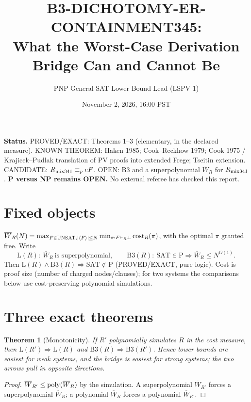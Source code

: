 \documentclass[11pt]{article}
\title{B3-DICHOTOMY-ER-CONTAINMENT345:\\ What the Worst-Case Derivation Bridge Can and Cannot Be}
\author{PNP General SAT Lower-Bound Lead (LSPV-1)}
\date{November 2, 2026, 16:00 PST}
\newtheorem{theorem}{Theorem}
\begin{document}
\maketitle
\noindent\textbf{Status.} PROVED/EXACT: Theorems 1--3 (elementary, in the declared measure). KNOWN THEOREM: Haken 1985; Cook--Reckhow 1979; Cook 1975 / Krajicek--Pudlak translation of PV proofs into extended Frege; Tseitin extension. CANDIDATE: $R_{\rm mix341}\equiv_p eF$. OPEN: B3 and a superpolynomial $\overline W_R$ for $R_{\rm mix341}$. \textbf{P versus NP remains OPEN.} No external referee has checked this report.

\section{Fixed objects}
$\overline W_R(N)=\max_{F\in{\rm UNSAT},|\langle F\rangle|\le N}\min_{\pi:F\vdash_R\bot}{\rm cost}_R(\pi)$, with the optimal $\pi$ granted free. Write
\[
\mathrm{L}(R):\ \overline W_R\ \text{is superpolynomial},\qquad
\mathrm{B3}(R):\ \mathrm{SAT}\in\mathrm P\Rightarrow\overline W_R\le N^{O(1)}.
\]
Then $\mathrm{L}(R)\wedge\mathrm{B3}(R)\Rightarrow \mathrm{SAT}\notin\mathrm P$ (PROVED/EXACT, pure logic). Cost is proof size (number of charged nodes/clauses); for two systems the comparisons below use cost-preserving polynomial simulations.

\section{Three exact theorems}
\begin{theorem}[Monotonicity]\label{t:mono}
If $R'$ polynomially simulates $R$ in the cost measure, then $\mathrm{L}(R')\Rightarrow\mathrm{L}(R)$ and $\mathrm{B3}(R)\Rightarrow\mathrm{B3}(R')$. Hence lower bounds are easiest for weak systems, and the bridge is easiest for strong systems; the two arrows pull in opposite directions.
\end{theorem}
\begin{proof} $\overline W_{R'}\le{\rm poly}(\overline W_R)$ by the simulation. A superpolynomial $\overline W_{R'}$ forces a superpolynomial $\overline W_R$; a polynomial $\overline W_R$ forces a polynomial $\overline W_{R'}$.\end{proof}
\end{document}
